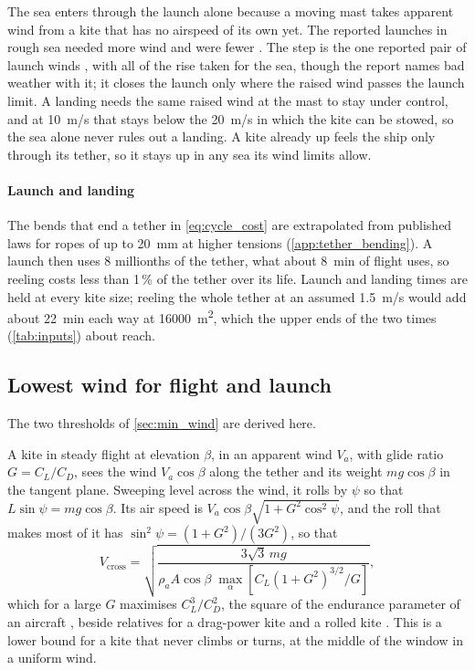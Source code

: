The sea enters through the launch alone because a moving mast takes apparent wind from a kite that has no airspeed of its own yet. The reported launches in rough sea needed more wind \citep{paulig2013} and were fewer \citep{cedelft2016}. The step is the one reported pair of launch winds \citep{paulig2013}, with all of the rise taken for the sea, though the report names bad weather with it; it closes the launch only where the raised wind passes the launch limit. A landing needs the same raised wind at the mast to stay under control, and at \SI{10}{m/s} that stays below the \SI{20}{m/s} in which the kite can be stowed, so the sea alone never rules out a landing. A kite already up feels the ship only through its tether, so it stays up in any sea its wind limits allow.

\paragraph{Launch and landing} The bends that end a tether in \cref{eq:cycle_cost} are extrapolated from published laws for ropes of up to \SI{20}{mm} at higher tensions (\cref{app:tether_bending}). A launch then uses 8 millionths of the tether, what about \SI{8}{min} of flight uses, so reeling costs less than 1\,\% of the tether over its life. Launch and landing times are held at every kite size; reeling the whole tether at an assumed \SI{1.5}{m/s} would add about \SI{22}{min} each way at \SI{16000}{m^2}, which the upper ends of the two times (\cref{tab:inputs}) about reach.

\subsection{Lowest wind for flight and launch}
\label{sec:det_min_wind}

The two thresholds of \cref{sec:min_wind} are derived here.

A kite in steady flight at elevation $\beta$, in an apparent wind $V_a$, with glide ratio $G=C_L/C_D$, sees the wind $V_a\cos\beta$ along the tether and its weight $mg\cos\beta$ in the tangent plane. Sweeping level across the wind, it rolls by $\psi$ so that $L\sin\psi=mg\cos\beta$. Its air speed is $V_a\cos\beta\sqrt{1+G^2\cos^2\psi}$, and the roll that makes most of it has $\sin^2\psi=(1+G^2)/(3G^2)$, so that
\begin{equation}
V_\mathrm{cross} = \sqrt{\frac{3\sqrt{3}\,mg}{\rho_a A\cos\beta\;\max_\alpha\left[C_L(1+G^2)^{3/2}/G\right]}},
\label{eq:min_cross}
\end{equation}
which for a large $G$ maximises $C_L^3/C_D^2$, the square of the endurance parameter of an aircraft \citep{echeverri2020part1}, beside relatives for a drag-power kite \citep{bauer2018} and a rolled kite \citep{luchsinger2013,joshi2024powercurve}.  This is a lower bound for a kite that never climbs or turns, at the middle of the window in a uniform wind.

